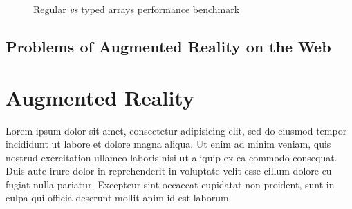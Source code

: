 \begin{figure}[!htb]
  \caption{Regular \textit{vs} typed arrays performance benchmark}
  \label{figure:typed_arrays_performance}
\end{figure}


\subsection{Problems of Augmented Reality on the Web} %
\label{sub:basic_concepts:web:problems_of_augmented_reality_on_the_web}



\section{Augmented Reality} %
\label{sec:basic_concepts:augmented_reality}

Lorem ipsum dolor sit amet, consectetur adipisicing elit, sed do eiusmod
tempor incididunt ut labore et dolore magna aliqua. Ut enim ad minim veniam,
quis nostrud exercitation ullamco laboris nisi ut aliquip ex ea commodo
consequat. Duis aute irure dolor in reprehenderit in voluptate velit esse
cillum dolore eu fugiat nulla pariatur. Excepteur sint occaecat cupidatat non
proident, sunt in culpa qui officia deserunt mollit anim id est laborum.

